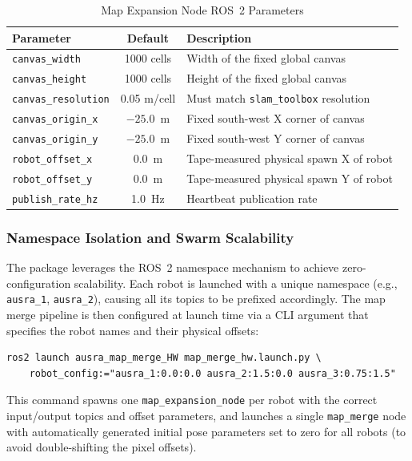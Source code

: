 \documentclass{article}
\begin{document}
\begin{table}[H]
\centering
\caption{Map Expansion Node ROS~2 Parameters}
\label{tab:map_merge_params}
\begin{tabular}{|l|c|p{6cm}|}
\hline
\textbf{Parameter} & \textbf{Default} & \textbf{Description} \\
\hline
\texttt{canvas\_width} & 1000 cells & Width of the fixed global canvas \\
\hline
\texttt{canvas\_height} & 1000 cells & Height of the fixed global canvas \\
\hline
\texttt{canvas\_resolution} & 0.05 m/cell & Must match \texttt{slam\_toolbox} resolution \\
\hline
\texttt{canvas\_origin\_x} & $-25.0$~m & Fixed south-west X corner of canvas \\
\hline
\texttt{canvas\_origin\_y} & $-25.0$~m & Fixed south-west Y corner of canvas \\
\hline
\texttt{robot\_offset\_x} & 0.0~m & Tape-measured physical spawn X of robot \\
\hline
\texttt{robot\_offset\_y} & 0.0~m & Tape-measured physical spawn Y of robot \\
\hline
\texttt{publish\_rate\_hz} & 1.0~Hz & Heartbeat publication rate \\
\hline
\end{tabular}
\end{table}

\subsubsection{Namespace Isolation and Swarm Scalability}

The package leverages the ROS~2 namespace mechanism to achieve zero-configuration scalability. Each robot is launched with a unique namespace (e.g., \texttt{ausra\_1}, \texttt{ausra\_2}), causing all its topics to be prefixed accordingly. The map merge pipeline is then configured at launch time via a CLI argument that specifies the robot names and their physical offsets:

\begin{verbatim}
ros2 launch ausra_map_merge_HW map_merge_hw.launch.py \
    robot_config:="ausra_1:0.0:0.0 ausra_2:1.5:0.0 ausra_3:0.75:1.5"
\end{verbatim}

This command spawns one \texttt{map\_expansion\_node} per robot with the correct input/output topics and offset parameters, and launches a single \texttt{map\_merge} node with automatically generated initial pose parameters set to zero for all robots (to avoid double-shifting the pixel offsets).
\end{document}
